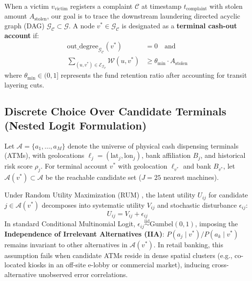 \documentclass[conference]{IEEEtran}
\begin{document}
When a victim $v_{\text{victim}}$ registers a complaint $\mathcal{C}$ at timestamp $t_{\text{complaint}}$ with stolen amount $A_{\text{stolen}}$, our goal is to trace the downstream laundering directed acyclic graph (DAG) $\mathcal{G}_{\mathcal{C}} \subset \mathcal{G}$.
A node $v^* \in \mathcal{G}_{\mathcal{C}}$ is designated as a \textbf{terminal cash-out account} if:
\begin{align}
\text{out\_degree}_{\mathcal{G}_{\mathcal{C}}}(v^*) &= 0 \quad \text{and} \nonumber \\
\sum_{(u, v^*) \in \mathcal{E}_{\mathcal{G}_{\mathcal{C}}}} \mathcal{W}(u, v^*) &\ge \theta_{\text{min}} \cdot A_{\text{stolen}}
\end{align}
where $\theta_{\text{min}} \in (0, 1]$ represents the fund retention ratio after accounting for transit layering cuts.
\subsection{Discrete Choice Over Candidate Terminals (Nested Logit Formulation)}
Let $\mathcal{A} = \{a_1, \dots, a_M\}$ denote the universe of physical cash dispensing terminals (ATMs), with geolocations $\ell_j = (\text{lat}_j, \text{lon}_j)$, bank affiliation $B_j$, and historical risk score $\rho_j$. For terminal account $v^*$ with geolocation $\ell_{v^*}$ and bank $B_{v^*}$, let $\mathcal{A}(v^*) \subset \mathcal{A}$ be the reachable candidate set ($J = 25$ nearest machines).

Under Random Utility Maximization (RUM) \cite{mcfadden1974, train2009}, the latent utility $U_{ij}$ for candidate $j \in \mathcal{A}(v^*)$ decomposes into systematic utility $V_{ij}$ and stochastic disturbance $\epsilon_{ij}$:
\begin{equation}
U_{ij} = V_{ij} + \epsilon_{ij}
\end{equation}
In standard Conditional Multinomial Logit, $\epsilon_{ij} \overset{\text{iid}}{\sim} \text{Gumbel}(0, 1)$, imposing the \textbf{Independence of Irrelevant Alternatives (IIA)}: $P(a_j \mid v^*) / P(a_k \mid v^*)$ remains invariant to other alternatives in $\mathcal{A}(v^*)$. In retail banking, this assumption fails when candidate ATMs reside in dense spatial clusters (e.g., co-located kiosks in an off-site e-lobby or commercial market), inducing cross-alternative unobserved error correlations.
\end{document}
